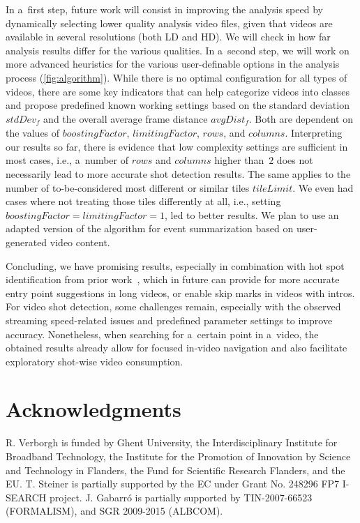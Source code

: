 \documentclass{sig-alternate}
\begin{document}
In a~first step, future work will consist in improving the analysis speed by dynamically selecting lower quality analysis video files, given that videos are available in several resolutions (both LD and HD). We will check in how far analysis results differ for the various qualities. In a~second step, we will work on more advanced heuristics for the various user-definable options in the analysis process (\autoref{fig:algorithm}). While there is no optimal configuration for all types of videos, there are some key indicators that can help categorize videos into classes and propose predefined known working settings based on the standard deviation $\mathit{stdDev_{f}}$ and the overall average frame distance $\mathit{avgDist_{f}}$. Both are dependent on the values of $\mathit{boostingFactor}$, $\mathit{limitingFactor}$, $\mathit{rows}$, and $\mathit{columns}$. Interpreting our results so far, there is evidence that low complexity settings are sufficient in most cases, i.e., a~number of $\mathit{rows}$ and $\mathit{columns}$ higher than~$\mathit{2}$ does not necessarily lead to more accurate shot detection results. The same applies to the number of to-be-considered most different or similar tiles $\mathit{tileLimit}$. We even had cases where not treating those tiles differently at all, i.e., setting $\mathit{boostingFactor} = \mathit{limitingFactor} = \mathit{1}$, led to better results. We plan to use an adapted version of the algorithm for event summarization based on user-generated video content.

Concluding, we have promising results, especially in combination with hot spot identification from prior work~\cite{derive2011}, which in future can provide for more accurate entry point suggestions in long videos, or enable skip marks in videos with intros.
For video shot detection, some challenges remain, especially with the observed streaming speed-related issues and predefined parameter settings to improve accuracy. None\-theless, when searching for a~certain point in a~video, the obtained results already allow for focused in-video navigation and also facilitate exploratory shot-wise video consumption.

\section{Acknowledgments} 
\small
R. Verborgh is funded by Ghent University, the Interdisciplinary Institute for Broadband Technology, the Institute for the Promotion of Innovation by Science and Technology in Flanders, the Fund for Scientific Research Flanders, and the EU.
T. Steiner is partially supported by the EC under Grant No. 248296 FP7 \mbox{I-SEARCH} project.
J. Gabarr\'o is partially supported by TIN-2007-66523 (FORMALISM), and SGR 2009-2015 (ALBCOM).
\normalsize




\balancecolumns
\end{document}
